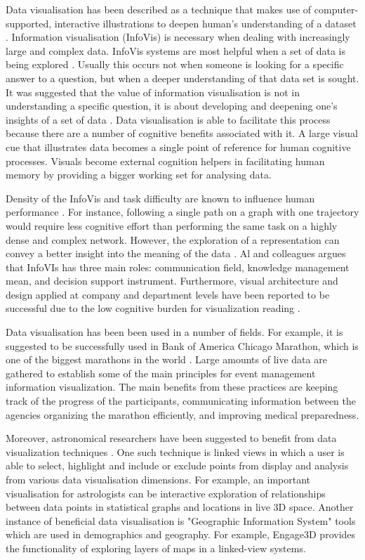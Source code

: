 \documentclass{l4proj}
\begin{document}
Data visualisation has been described as a technique that makes use of computer-supported, interactive illustrations to deepen human's understanding of a dataset \cite{card1999readings}. Information visualisation (InfoVis) is necessary when dealing with increasingly large and complex data. InfoVis systems are most helpful when a set of data is being explored \cite{fekete2008value}. Usually this occurs not when someone is looking for a specific answer to a question, but when a deeper understanding of that data set is sought. It was suggested that the value of information visualisation is not in understanding a specific question, it is about developing and deepening one's insights of a set of data \cite{fekete2008value}. Data visualisation is able to facilitate this process because there are a number of cognitive benefits associated with it. A large visual cue that illustrates data becomes a single point of reference for human cognitive processes. Visuals become external cognition helpers in facilitating human memory by providing a bigger working set for analysing data. 

Density of the InfoVis and task difficulty are known to influence human performance \cite{netzel2014comparative}. For instance, following a single path on a graph with one trajectory would require less cognitive effort than performing the same task on a highly dense and complex network. However, the exploration of a representation can convey a better insight into the meaning of the data \cite{al2014information}. Al and colleagues \cite{al2014information} argues that InfoVIs has three main roles: communication field, knowledge management mean, and decision support instrument. Furthermore, visual architecture and design applied at company and department levels have been reported to be successful due to the low cognitive burden for visualization reading \cite{king2016cognitive}.

Data visualisation has been been used in a number of fields. For example, it is suggested to be successfully used in Bank of America Chicago Marathon, which is one of the biggest marathons in the world \cite{hanken2016developing}. Large amounts of live data are gathered to establish some of the main principles for event management information visualization. The main benefits from these practices are keeping track of the progress of the participants, communicating information between the agencies organizing the marathon efficiently, and improving medical preparedness. 

Moreover, astronomical researchers have been suggested to benefit from data visualization techniques \cite{goodman2012principles}. One such technique is linked views in which a user is able to select, highlight and include or exclude points from display and analysis from various data visualisation dimensions. For example, an important visualisation for astrologists can be interactive exploration of relationships between data points in statistical graphs and locations in live 3D space. Another instance of beneficial data visualisation is "Geographic Information System" tools which are used in demographics and geography. For example, Engage3D provides the functionality of exploring layers of maps in a linked-view systems. 
\end{document}

